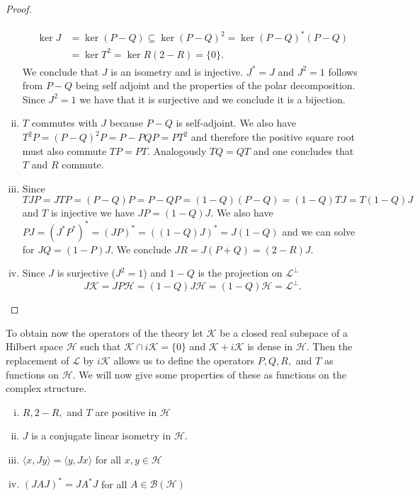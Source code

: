\begin{proof}
\begin{enumerate}[(i)]
\begin{align}
\begin{split}
\ker J&=\ker (P-Q)\subseteq\ker(P-Q)^2=\ker(P-Q)^*(P-Q) \\
&=\ker T^2=\ker R(2-R)=\{0\}.
\end{split}
\end{align}
We conclude that $J$ is an isometry and is injective. $J^*=J$ and $J^2=1$ follows from $P-Q$ being self adjoint and the properties of the polar decomposition. Since $J^2=1$ we have that it is surjective and we conclude it is a bijection.
\item $T$ commutes with $J$ because $P-Q$ is self-adjoint. We also have $T^2P=(P-Q)^2P=P-PQP=PT^2$ and therefore the positive square root must also commute $TP=PT$. Analogously $TQ=QT$ and one concludes that $T$ and $R$ commute.
\item Since $TJP=JTP=(P-Q)P=P-QP=(1-Q)(P-Q)=(1-Q)TJ=T(1-Q)J$ and $T$ is injective we have $JP=(1-Q)J$. We also have $PJ=(J^*P^*)^*=(JP)^*=((1-Q)J)^*=J(1-Q)$ and we can solve for $JQ=(1-P)J$. We conclude $JR=J(P+Q)=(2-R)J.$
\item Since $J$ is surjective ($J^2=1$) and $1-Q$ is the projection on $\mathcal{L}^\bot$ 
\begin{equation}
J\mathcal{K}=JP\mathcal{H}=(1-Q)J\mathcal{H}=(1-Q)\mathcal{H}=\mathcal{L}^\bot.
\end{equation}
\end{enumerate}
\end{proof}

To obtain now the operators of the theory let $\mathcal{K}$ be a closed real subspace of a Hilbert space $\mathcal{H}$ such that $\mathcal{K}\cap i\mathcal{K}=\{0\}$ and $\mathcal{K}+i\mathcal{K}$ is dense in $\mathcal{H}$. Then the replacement of $\mathcal{L}$ by $i\mathcal{K}$ allows us to define the operators $P,Q,R,$ and $T$ as functions on $\mathcal{H}$. We will now give some properties of these as functions on the complex structure.  

\begin{theorem}
\begin{enumerate}[(i)]
\item $R,2-R,$ and $T$ are positive in $\mathcal{H}$
\item $J$ is a conjugate linear isometry in $\mathcal{H}$.
\item $\langle x, Jy\rangle=\langle y, Jx\rangle$ for all $x,y\in\mathcal{H}$ 
\item $(JAJ)^*=JA^*J$ for all $A\in\mathcal{B}(\mathcal{H})$
\end{enumerate}
\end{theorem}

